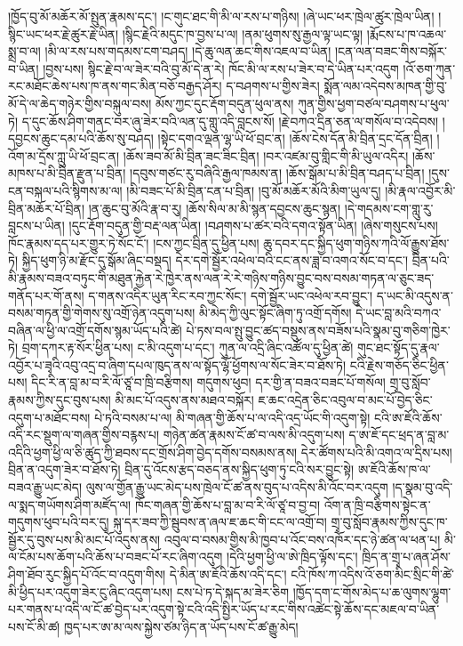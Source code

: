 \documentclass{article}
\begin{document}
།ཁྱོད་བུ་མོ་མཆོར་མོ་སྤུན་རྣམས་དང་། །ང་གུང་ཐང་གི་མི་ལ་རས་པ་གཉིས། །ཞེ་ཡང་ཕར་ཁྲེལ་ཚུར་ཁྲེལ་ཡིན། །སྙིང་ཡང་ཕར་རྗེ་ཚུར་རྗེ་ཡིན། །སྙིང་རྗེའི་མདུང་ཁ་བྱས་པ་ལ། །ནམ་ཕུགས་སུ་རྒྱལ་ལྟ་ཡང་ལྟ། །རྨོངས་པ་ཁ་འཆལ་སྨྲ་བ་ལ། །མི་ལ་རས་པས་གདམས་ངག་བཤད། །དེ་ཆུ་ལན་ཆང་གིས་འཇལ་བ་ཡིན། །ངན་ལན་བཟང་གིས་བསྐོར་བ་ཡིན། །བྱས་པས། སྙིང་རྗེ་བ་ལ་ཟེར་བའི་བུ་མོ་དེ་ན་རེ། ཁོང་མི་ལ་རས་པ་ཟེར་བ་དེ་ཡིན་པར་འདུག །འོ་ཅག་ཀུན་རང་མཐོང་ཆེས་པས་ཁ་ནས་གང་མིན་བཅོ་བརྒྱད་ཤོར། ད་བཤགས་པ་གྱིས་ཟེར། སྨོན་ལམ་འདེབས་མཁན་གྱི་བུ་མོ་དེ་ལ་ཆེད་གཉེར་གྱིས་བསྐུལ་བས། མོས་ཀྱང་དུང་རྡོག་བདུན་ཕུལ་ནས། ཀུན་གྱིས་ཕྱག་བཙལ་བཤགས་པ་ཕུལ་ཏེ། ད་དུང་ཆོས་ཤིག་གནང་བར་ཞུ་ཟེར་བའི་ལན་དུ་གླུ་འདི་བླངས་སོ། །རྗེ་བཀའ་དྲིན་ཅན་ལ་གསོལ་བ་འདེབས། །དབྱངས་ཆུང་དམ་པའི་ཆོས་སུ་བཤད། །སྟེང་དགའ་ལྡན་ལྷ་ཡི་ཕོ་བྲང་ན། །ཆོས་ངེས་དོན་མི་བྲིན་དྲང་དོན་བྲིན། །འོག་མ་དྲོས་ཀླུ་ཡི་ཕོ་བྲང་ན། །ཆོས་ཟབ་མོ་མི་བྲིན་ཟང་ཟིང་བྲིན། །བར་འཛམ་བུ་གླིང་གི་མི་ཡུལ་འདིར། །ཆོས་མཁས་པ་མི་བྲིན་རྫུན་པ་བྲིན། །དབུས་གཙང་རུ་བཞིའི་རྒྱལ་ཁམས་ན། །ཆོས་སྒོམ་པ་མི་བྲིན་བཤད་པ་བྲིན། །དུས་ངན་བསྐལ་པའི་སྙིགས་མ་ལ། །མི་བཟང་པོ་མི་བྲིན་ངན་པ་བྲིན། །བུ་མོ་མཆོར་མོའི་མིག་ཡུལ་དུ། །མི་རྣལ་འབྱོར་མི་བྲིན་མཆོར་པོ་བྲིན། །ན་ཆུང་བུ་མོའི་རྣ་བ་རུ། །ཆོས་སིལ་མ་མི་སྙན་དབྱངས་ཆུང་སྙན། །དེ་གདམས་ངག་གླུ་རུ་བླངས་པ་ཡིན། །དུང་རྡོག་བདུན་གྱི་བརྡ་ལན་ཡིན། །བཤགས་པ་ཚར་བའི་དགའ་སྟོན་ཡིན། །ཞེས་གསུངས་པས། ཁོང་རྣམས་དད་པར་གྱུར་ཏེ་སོང་ངོ་། །ངས་ཀྱང་བྲིན་དུ་ཕྱིན་པས། ཆུ་དབར་དང་སྐྱིད་ཕུག་གཉིས་ཀའི་ལོ་རྒྱུས་ཐོས་ཏེ། སྐྱིད་ཕུག་ཉི་མ་རྫོང་དུ་སྒོམ་ཞིང་བསྡད། དེར་དགེ་སྦྱོར་འཕེལ་བའི་ངང་ནས་ཟླ་བ་འགའ་སོང་བ་དང་། བྲིན་པའི་མི་རྣམས་བཟའ་བཏུང་གི་མཐུན་རྐྱེན་རེ་ཁྱེར་ནས་ལན་རེ་རེ་གཉིས་གཉིས་བྱུང་བས་བསམ་གཏན་ལ་ཅུང་ཟད་གནོད་པར་གོ་ནས། ད་གནས་འདིར་ཡུན་རིང་རབ་ཀྱང་སོང་། དགེ་སྦྱོར་ཡང་འཕེལ་རབ་བྱུང་། ད་ཡང་མི་འདུས་ན་བསམ་གཏན་གྱི་གེགས་སུ་འགྲོ་ཉེན་འདུག་པས། མི་མེད་ཀྱི་ལུང་སྟོང་ཞིག་ཏུ་འགྲོ་དགོས། དེ་ཡང་བླ་མའི་བཀའ་བཞིན་ལ་ཕྱི་ལ་འགྲོ་དགོས་སྙམ་ཡོད་པའི་ཚེ། པེ་ཏས་བལ་སྤུ་བྱུང་ཚད་བསྡུས་ནས་བཟོས་པའི་སྣམ་བུ་གཅིག་ཁྱེར་ཏེ། བྲག་དཀར་རྟ་སོར་ཕྱིན་པས། ང་མི་འདུག་པ་དང་། ཀུན་ལ་འདྲི་ཞིང་འཚོལ་དུ་ཕྱིན་ཚེ། གུང་ཐང་སྟོད་དུ་རྣལ་འབྱོར་པ་ཟྭའི་འབུ་འདྲ་བ་ཞིག་དཔལ་ཁུད་ནས་ལ་སྟོད་ལྷོ་ཕྱོགས་ལ་སོང་ཟེར་བ་ཐོས་ཏེ། ངའི་རྗེས་གཅོད་ཅིང་ཕྱིན་པས། དིང་རི་ན་བླ་མ་བ་རི་ལོ་ཙཱ་བ་ཁྲི་བརྩིགས། གདུགས་ཕུབ། དར་གྱི་ན་བཟའ་བཟང་པོ་གསོལ། གྲྭ་བུ་སློབ་རྣམས་ཀྱིས་དུང་བུས་པས། མི་མང་པོ་འདུས་ནས་མཐའ་བསྐོར། ཇ་ཆང་འདྲེན་ཅིང་འབུལ་བ་མང་པོ་བྱེད་ཅིང་འདུག་པ་མཐོང་བས། པེ་ཏའི་བསམ་པ་ལ། མི་གཞན་གྱི་ཆོས་པ་ལ་འདི་འདྲ་ཡོང་གི་འདུག་སྟེ། ངའི་ཨ་ཇོའི་ཆོས་འདི་རང་སྡུག་ལ་གཞན་གྱིས་བརྙས་པ། གཉེན་ཚན་རྣམས་ངོ་ཚ་བ་ལས་མི་འདུག་པས། ད་ཨ་ཇོ་དང་ཕྲད་ན་བླ་མ་འདིའི་ཕྱག་ཕྱི་ལ་ཅི་ཚུད་ཀྱི་ཐབས་དང་གྲོས་ཤིག་བྱེད་དགོས་བསམས་ནས། དེར་ཚོགས་པའི་མི་འགའ་ལ་དྲིས་པས། བྲིན་ན་འདུག་ཟེར་བ་ཐོས་ཏེ། བྲིན་དུ་འོངས་རྩད་བཅད་ནས་སྐྱིད་ཕུག་ཏུ་ངའི་སར་བྱུང་སྟེ། ཨ་ཇོའི་ཆོས་ཁ་ལ་བཟའ་རྒྱུ་ཡང་མེད། ལུས་ལ་གྱོན་རྒྱུ་ཡང་མེད་པས་ཁྲེལ་ངོ་ཚ་ནས་བུད་པ་འདིས་མི་འོང་བར་འདུག །ད་སྣམ་བུ་འདི་ལ་སྨད་གཡོགས་ཤིག་མཛོད་ལ། ཁོང་གཞན་གྱི་ཆོས་པ་བླ་མ་བ་རི་ལོ་ཙཱ་བ་བྱ་བ། འོག་ན་ཁྲི་བརྩིགས་སྟེང་ན་གདུགས་ཕུབ་པའི་བར་དུ། སྐུ་དར་ཟབ་ཀྱི་སྦུབས་ན་ཞལ་ཇ་ཆང་གི་ངང་ལ་འགྲོ་བ། གྲྭ་བུ་སློབ་རྣམས་ཀྱིས་དུང་ཁ་སྦྱོར་དུ་བུས་པས་མི་མང་པོ་འདུས་ནས། འབུལ་བ་བསམ་གྱིས་མི་ཁྱབ་པ་འོང་བས་འཁོར་དང་ཉེ་ཚན་ལ་ཕན་པ། མི་ལ་ངོམ་པས་ཆོག་པའི་ཆོས་པ་བཟང་པོ་རང་ཞིག་འདུག །དེའི་ཕྱག་ཕྱི་ལ་ཨེ་ཁྲིད་ལྟོས་དང་། ཁྲིད་ན་གྲྭ་པ་ཞན་ཤོས་ཤིག་ཐོབ་རུང་སྐྱིད་པོ་འོང་བ་འདུག་གིས། དེ་མིན་ཨ་ཇོའི་ཆོས་འདི་དང་། ངའི་ཁོས་ཀ་འདིས་འོ་ཅག་མིང་སྲིང་གི་ཚེ་མི་ཕྱིད་པར་འདུག་ཟེར་ངུ་ཞིང་འདུག་པས། ངས་པེ་ཏ་དེ་སྐད་མ་ཟེར་ཅིག །ཁྱོད་དག་ང་གོས་མེད་པ་ཆ་ལུགས་ལྷུག་པར་གནས་པ་འདི་ལ་ངོ་ཚ་བྱེད་པར་འདུག་སྟེ་ངའི་འདི་སྤྱིར་ཡོད་པ་རང་གིས་འཚེང་སྟེ་ཆོས་དང་མཇལ་བ་ཡིན་པས་ངོ་མི་ཚ། ཁྱད་པར་ཨ་མ་ལས་སྐྱེས་ཙམ་ཉིད་ན་ཡོད་པས་ངོ་ཚ་རྒྱུ་མེད། 
\end{document}
